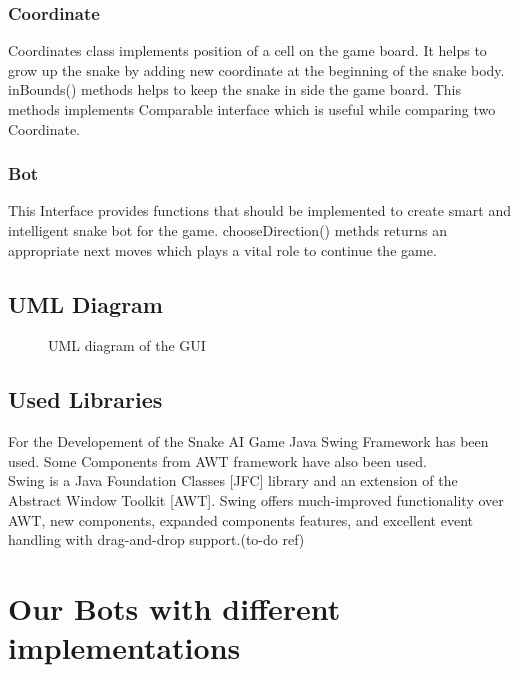 \documentclass[a4paper,12pt]{article}
\begin{document}
\subsubsection{Coordinate}
Coordinates class implements position of a cell on the game board. It helps to grow up the snake by adding new coordinate at the beginning of the snake body. inBounds() methods helps to keep the snake in side the game board. This methods implements Comparable interface which is useful while comparing two Coordinate. 
\subsubsection{Bot}
This Interface provides functions that should be implemented to create smart and intelligent snake bot for the game. chooseDirection() methds returns an appropriate next moves which plays a vital role to continue the game. 

\subsection{UML Diagram}

\begin{figure}[h]
\centering
\caption{UML diagram of the GUI}
\end{figure}

\subsection{Used Libraries}
For the Developement of the Snake AI Game Java Swing Framework has been used.
Some Components from AWT framework have also been used.\\ 
Swing is a Java Foundation Classes [JFC] library and an extension of the Abstract Window Toolkit [AWT]. Swing offers much-improved functionality over AWT, new components, expanded components features, and excellent event handling with drag-and-drop support.(to-do ref)
 
\section{Our Bots with different implementations}
\end{document}
